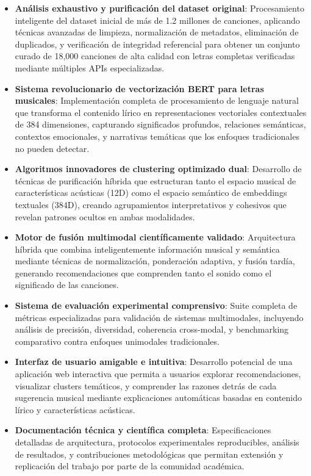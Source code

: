 \documentclass[12pt,a4paper]{article}
\begin{document}
\begin{itemize}
    \item \textbf{Análisis exhaustivo y purificación del dataset original}: Procesamiento inteligente del dataset inicial de más de 1.2 millones de canciones, aplicando técnicas avanzadas de limpieza, normalización de metadatos, eliminación de duplicados, y verificación de integridad referencial para obtener un conjunto curado de 18,000 canciones de alta calidad con letras completas verificadas mediante múltiples APIs especializadas.
    
    \item \textbf{Sistema revolucionario de vectorización BERT para letras musicales}: Implementación completa de procesamiento de lenguaje natural que transforma el contenido lírico en representaciones vectoriales contextuales de 384 dimensiones, capturando significados profundos, relaciones semánticas, contextos emocionales, y narrativas temáticas que los enfoques tradicionales no pueden detectar.
    
    \item \textbf{Algoritmos innovadores de clustering optimizado dual}: Desarrollo de técnicas de purificación híbrida que estructuran tanto el espacio musical de características acústicas (12D) como el espacio semántico de embeddings textuales (384D), creando agrupamientos interpretativos y cohesivos que revelan patrones ocultos en ambas modalidades.
    
    \item \textbf{Motor de fusión multimodal científicamente validado}: Arquitectura híbrida que combina inteligentemente información musical y semántica mediante técnicas de normalización, ponderación adaptiva, y fusión tardía, generando recomendaciones que comprenden tanto el sonido como el significado de las canciones.
    
    \item \textbf{Sistema de evaluación experimental comprensivo}: Suite completa de métricas especializadas para validación de sistemas multimodales, incluyendo análisis de precisión, diversidad, coherencia cross-modal, y benchmarking comparativo contra enfoques unimodales tradicionales.
    
    \item \textbf{Interfaz de usuario amigable e intuitiva}: Desarrollo potencial de una aplicación web interactiva que permita a usuarios explorar recomendaciones, visualizar clusters temáticos, y comprender las razones detrás de cada sugerencia musical mediante explicaciones automáticas basadas en contenido lírico y características acústicas.
    
    \item \textbf{Documentación técnica y científica completa}: Especificaciones detalladas de arquitectura, protocolos experimentales reproducibles, análisis de resultados, y contribuciones metodológicas que permitan extensión y replicación del trabajo por parte de la comunidad académica.
\end{itemize}
\end{document}
